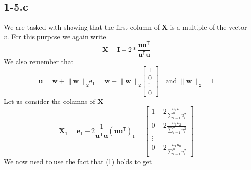 \documentclass{article}
\begin{document}
\subsection*{1-5.c}
We are tasked with showing that the first column of $\mathbf{X}$ is a multiple of the vector $v$. For this purpose we again write
\begin{equation*}
    \mathbf{X} = \mathbf{I} - 2 * \frac{\mathbf{u}\mathbf{u}^{\mathsf{T}}}{\mathbf{u}^{\mathsf{T}}\mathbf{u}}
\end{equation*}
We also remember that 
\begin{equation}
    \mathbf{u} = \mathbf{w} + \left\lVert \mathbf{w}\right\rVert_{2}\mathbf{e}_{1} = \mathbf{w} + \left\lVert \mathbf{w}\right\rVert_{2}\begin{bmatrix}
        1 \\
        0 \\
        \vdots  \\
        0
    \end{bmatrix} \quad \text{and }\left\lVert \mathbf{w}\right\rVert_{2} = 1 
\end{equation}
Let us consider the columns of $\mathbf{X}$
\begin{equation*}
    \mathbf{X}_{1} = 
        \mathbf{e}_{1} - 2 \frac{1}{\mathbf{u}^{\mathsf{T}}\mathbf{u}} \left(\mathbf{u}\mathbf{u}^{\mathsf{T}}\right)_{1}
   = 
   \begin{bmatrix}
     1 - 2 \frac{u_{1}u_{1}}{\sum_{i=1}^{n}u_{i}^{2}} \\
     0 - 2 \frac{u_{1}u_{2}}{\sum_{i=1}^{n}u_{i}^{2}} \\
     \vdots \\
     0 - 2 \frac{u_{1}u_{n}}{\sum_{i=1}^{n}u_{i}^{2}}
   \end{bmatrix}
\end{equation*}
We now need to use the fact that (1) holds to get
\end{document}
